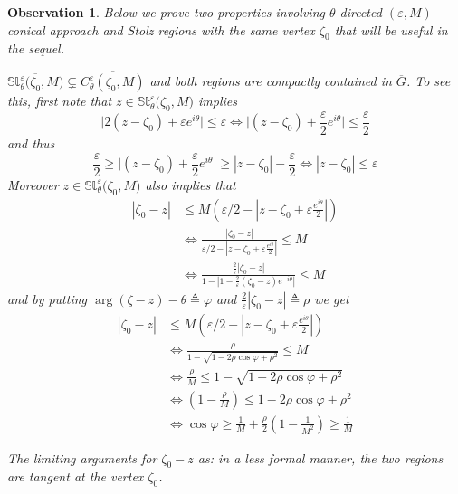 \documentclass[a4paper,10pt]{article}
\newcommand{\St}{\mathbb{St}}
\newtheorem{obs}{Observation}
\begin{document}
\begin{obs} Below we prove two properties involving $\theta$-directed $(\varepsilon,M)$-conical approach and Stolz regions with the same vertex $\zeta_0$ that will be useful in the sequel.
  \item $\overline{ \St_\theta^\varepsilon\big(\zeta_0,M\big)}\subsetneq\overline{ C_{\theta}^{\varepsilon}(\zeta_0,M)}$ and both regions are compactly contained in $\overline{G}$.  To see this, first note that $z\in\St_\theta^\varepsilon\big(\zeta_0,M\big)$ implies 
    \[
      \big| 2(z - \zeta_0) + {\varepsilon}{ e^{i\theta}}\big|\le \varepsilon \iff \big| (z - \zeta_0) + \frac{\varepsilon}{2}{ e^{i\theta}}\big|\le \frac{\varepsilon}{2}
    \]
    and thus
    \[
      \frac{\varepsilon}{2} \ge \big| (z - \zeta_0) + \frac{\varepsilon}{2}{ e^{i\theta}}\big|\ge | z - \zeta_0 | - \frac{\varepsilon}{2} \iff |z -\zeta_0|\le \varepsilon
    \]
    Moreover $z\in\St_\theta^\varepsilon\big(\zeta_0,M\big)$ also implies that
    \[
      \begin{split}
        {|\zeta_0-z|} & \le M{\left({\varepsilon}/{2} - \left|z - \zeta_0 + {\varepsilon}\tfrac{ e^{i\theta}}{2}\right|\right)} \\
        & \iff \frac{|\zeta_0-z|}{{\varepsilon}/{2} - \left|z - \zeta_0 + {\varepsilon}\tfrac{ e^{i\theta}}{2}\right|}\le M\\
        & \iff \frac{\frac{2}{\varepsilon}|\zeta_0-z|}{1 - \left|1 - \frac{2}{\varepsilon}(\zeta_0-z)e^{-i\theta}\right|}\le M
      \end{split}
    \]
    and by putting $\arg(\zeta- z)-\theta\triangleq\varphi$ and $\frac{2}{\varepsilon}|\zeta_0-z|\triangleq \rho$ we get
    \[
      \begin{split}
        {|\zeta_0-z|}&\le M{\left({\varepsilon}/{2} - \left|z - \zeta_0 + {\varepsilon}\tfrac{ e^{i\theta}}{2}\right|\right)} \\
        & \iff \frac{\rho}{1 - \sqrt{1-2\rho\cos\varphi +\rho^2}}\le M\\
        & \iff \frac{\rho}{M}\le {1 - \sqrt{1-2\rho\cos\varphi +\rho^2}} \\
        & \iff \left(1 - \frac{\rho}{M} \right) \le 1-2\rho\cos\varphi +\rho^2\\
        & \iff \cos\varphi \ge \frac{1}{M} + \frac{\rho}{2} \left(1 -\frac{1}{M^2}\right) \ge \frac{1}{M}
      \end{split}
    \]
  \item The limiting arguments for $\zeta_0 - z$ as: in a less formal manner, the two regions are tangent at the vertex $\zeta_0$.  
\end{obs}
\end{document}
